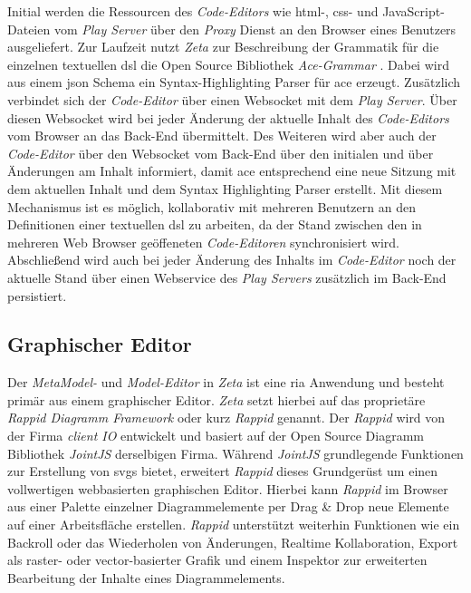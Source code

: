Initial werden die Ressourcen des \textit{Code-Editors} wie \ac{html}-, \ac{css}- und JavaScript-Dateien vom \textit{Play Server} über den \textit{Proxy} Dienst an den Browser eines Benutzers ausgeliefert. Zur Laufzeit  nutzt \textit{Zeta} zur Beschreibung der Grammatik für die einzelnen textuellen \ac{dsl} die Open Source Bibliothek \textit{Ace-Grammar} \cite{ace_grammar}. Dabei wird aus einem \ac{json} Schema ein Syntax-Highlighting Parser für \ac{ace} erzeugt. Zusätzlich verbindet sich der \textit{Code-Editor} über einen Websocket mit dem \textit{Play Server}. Über diesen Websocket wird bei jeder Änderung der aktuelle Inhalt des \textit{Code-Editors} vom Browser an das Back-End übermittelt. Des Weiteren wird aber auch der \textit{Code-Editor} über den Websocket vom Back-End über den initialen und über Änderungen am Inhalt informiert, damit \ac{ace} entsprechend eine neue Sitzung mit dem aktuellen Inhalt und dem Syntax Highlighting Parser erstellt. Mit diesem Mechanismus ist es möglich, kollaborativ mit mehreren Benutzern an den Definitionen einer textuellen \ac{dsl} zu arbeiten, da der Stand zwischen den in mehreren Web Browser geöffeneten \textit{Code-Editoren} synchronisiert wird. Abschließend wird auch bei jeder Änderung des Inhalts im \textit{Code-Editor} noch der aktuelle Stand über einen Webservice des \textit{Play Servers} zusätzlich im Back-End persistiert.

\subsection{Graphischer Editor}

Der \textit{MetaModel-} und \textit{Model-Editor} in \textit{Zeta} ist eine \ac{ria} Anwendung und besteht primär aus einem graphischer Editor. \textit{Zeta} setzt hierbei auf das proprietäre \textit{Rappid Diagramm Framework} oder kurz \textit{Rappid} genannt. Der \textit{Rappid} wird von der Firma \textit{client IO} entwickelt und basiert auf der Open Source Diagramm Bibliothek \textit{JointJS} derselbigen Firma. Während \textit{JointJS} grundlegende Funktionen zur Erstellung von \acp{svg} bietet, erweitert \textit{Rappid} dieses Grundgerüst um einen vollwertigen webbasierten graphischen Editor. Hierbei kann \textit{Rappid} im Browser aus einer Palette einzelner Diagrammelemente per Drag \& Drop neue Elemente auf einer Arbeitsfläche erstellen. \textit{Rappid} unterstützt weiterhin Funktionen wie ein Backroll oder das Wiederholen von Änderungen, Realtime Kollaboration, Export als raster- oder vector-basierter Grafik und einem Inspektor zur erweiterten Bearbeitung der Inhalte eines Diagrammelements.

